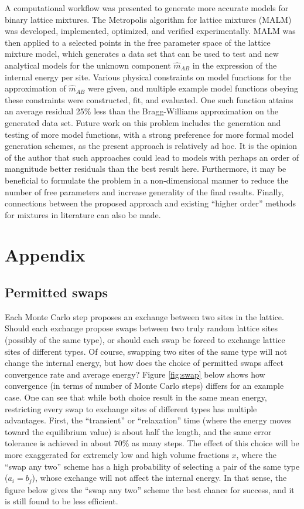 \documentclass[10pt]{article}
\begin{document}
A computational workflow was presented to generate more accurate models for binary lattice mixtures.
The Metropolis algorithm for lattice mixtures (MALM) was developed, implemented, optimized, and verified experimentally.
MALM was then applied to a selected points in the free parameter space of the lattice mixture model, which generates a data set that can be used to test and new analytical models for the unknown component $\hat{m}_{AB}$ in the expression of the internal energy per site.
Various physical constraints on model functions for the approximation of $\hat{m}_{AB}$ were given, and multiple example model functions obeying these constraints were constructed, fit, and evaluated.
One such function attains an average residual 25\% less than the Bragg-Williams approximation on the generated data set.
Future work on this problem includes the generation and testing of more model functions, with a strong preference for more formal model generation schemes, as the present approach is relatively ad hoc.
It is the opinion of the author that such approaches could lead to models with perhaps an order of mangnitude better residuals than the best result here.
Furthermore, it may be beneficial to formulate the problem in a non-dimensional manner to reduce the number of free parameters and increase generality of the final results.
Finally, connections between the proposed approach and existing ``higher order'' methods for mixtures in literature can also be made.


\clearpage
\section{Appendix}
\subsection{Permitted swaps}
Each Monte Carlo step proposes an exchange between two sites in the lattice.
Should each exchange propose swaps between two truly random lattice sites (possibly of the same type), or should each swap be forced to exchange lattice sites of different types.
Of course, swapping two sites of the same type will not change the internal energy, but how does the choice of permitted swaps affect convergence rate and average energy?
Figure \ref{fig:swap} below shows how convergence (in terms of number of Monte Carlo steps) differs for an example case.
One can see that while both choice result in the same mean energy, restricting every swap to exchange sites of different types has multiple advantages.
First, the ``transient'' or ``relaxation'' time (where the energy moves toward the equilibrium value) is about half the length, and the same error tolerance is achieved in about 70\% as many steps.
The effect of this choice will be more exaggerated for extremely low and  high volume fractions $x$, where the ``swap any two'' scheme has a high probability of selecting a pair of the same type ($a_i = b_j$), whose exchange will not affect the internal energy.
In that sense, the figure below gives the ``swap any two'' scheme the best chance for success, and it is still found to be less efficient.
\end{document}
